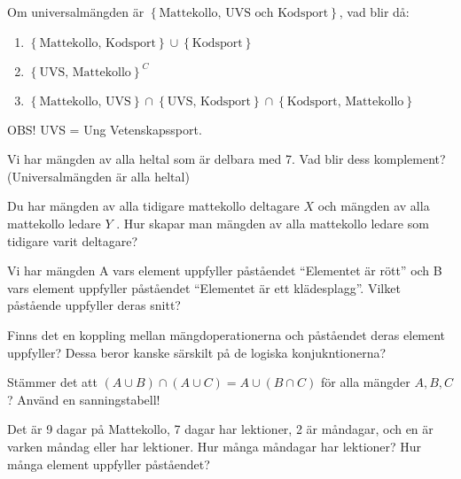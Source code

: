 \begin{problem}
	Om universalmängden är \(\left\{\text{Mattekollo, UVS och Kodsport} \right\}\), vad blir då:
	\begin{enumerate}
		\item \(\left\{\text{Mattekollo, Kodsport} \right\} \cup \left\{\text{Kodsport} \right\}\) 
		\item \(\left\{\text{UVS, Mattekollo}\right\}^C\) 
		\item \(\left\{\text{Mattekollo, UVS}\right\} \cap \left\{\text{UVS, Kodsport} \right\} \cap \left\{\text{Kodsport, Mattekollo} \right\}\) 
	\end{enumerate}
	
	OBS! UVS = Ung Vetenskapssport.
\end{problem}

\begin{problem}
	Vi har mängden av alla heltal som är delbara med 7. Vad blir dess komplement? (Universalmängden är alla heltal)
\end{problem}

\begin{problem}
	Du har mängden av alla tidigare mattekollo deltagare \(X\)  och mängden av alla mattekollo ledare \(Y\) . Hur skapar man mängden av alla mattekollo ledare som tidigare varit deltagare?
\end{problem}

\begin{problem}
	Vi har mängden A vars element uppfyller påståendet ``Elementet är rött'' och B vars element uppfyller påståendet ``Elementet är ett klädesplagg''. Vilket påstående uppfyller deras snitt?
\end{problem}

\begin{problem}
	Finns det en koppling mellan mängdoperationerna och påståendet deras element uppfyller? Dessa beror kanske särskilt på de logiska konjukntionerna?
\end{problem}

\begin{problem}
	Stämmer det att \((A \cup B) \cap (A \cup C) = A \cup (B \cap C)\) för alla mängder \(A, B, C\)? Använd en sanningstabell!
\end{problem}

\begin{problem}[Extra]
	Det är 9 dagar på Mattekollo, 7 dagar har lektioner, 2 är måndagar, och en är varken måndag eller har lektioner. Hur många måndagar har lektioner?
	Hur många element uppfyller påståendet?
\end{problem}

